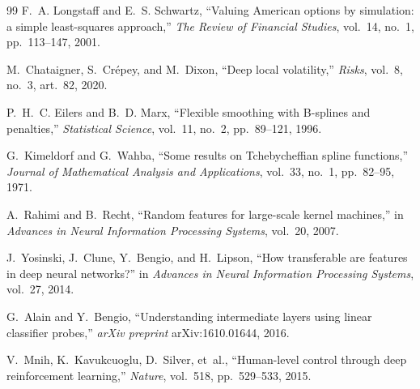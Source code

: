 \documentclass[11pt,a4paper]{article}
\theoremstyle{plain}
\theoremstyle{definition}
\theoremstyle{definition}
\begin{document}
\begin{thebibliography}{99}
 F.~A. Longstaff and E.~S. Schwartz, ``Valuing American options by simulation: a simple least-squares approach,'' \textit{The Review of Financial Studies}, vol.~14, no.~1, pp.~113--147, 2001.

 M.~Chataigner, S.~Cr\'epey, and M.~Dixon, ``Deep local volatility,'' \textit{Risks}, vol.~8, no.~3, art.~82, 2020.

 P.~H.~C. Eilers and B.~D. Marx, ``Flexible smoothing with {B}-splines and penalties,'' \textit{Statistical Science}, vol.~11, no.~2, pp.~89--121, 1996.

 G.~Kimeldorf and G.~Wahba, ``Some results on {T}chebycheffian spline functions,'' \textit{Journal of Mathematical Analysis and Applications}, vol.~33, no.~1, pp.~82--95, 1971.

 A.~Rahimi and B.~Recht, ``Random features for large-scale kernel machines,'' in \textit{Advances in Neural Information Processing Systems}, vol.~20, 2007.

 J.~Yosinski, J.~Clune, Y.~Bengio, and H.~Lipson, ``How transferable are features in deep neural networks?'' in \textit{Advances in Neural Information Processing Systems}, vol.~27, 2014.

 G.~Alain and Y.~Bengio, ``Understanding intermediate layers using linear classifier probes,'' \textit{arXiv preprint} arXiv:1610.01644, 2016.

 V.~Mnih, K.~Kavukcuoglu, D.~Silver, et~al., ``Human-level control through deep reinforcement learning,'' \textit{Nature}, vol.~518, pp.~529--533, 2015.

\end{thebibliography}
\end{document}

